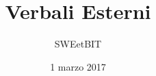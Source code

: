 


\usepackage{ragged2e}

\title{\textbf{Verbali Esterni}}
\author{SWEetBIT}

\date{1 marzo 2017}




\makeFrontPage

\tableofcontents





